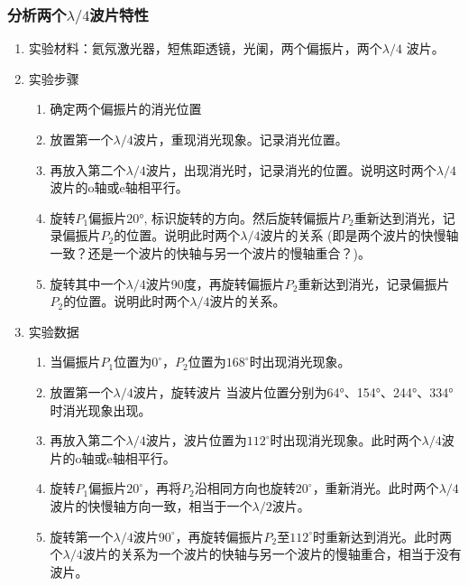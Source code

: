 \documentclass[dvipsnames, svgnames,a4paper,11pt]{article}
\begin{document}
\subsubsection{分析两个$\lambda/4$波片特性}
\begin{enumerate}
	
	\item 实验材料：氦氖激光器，短焦距透镜，光阑，两个偏振片，两个$\lambda/4$ 波片。
	\item 实验步骤
   \begin{enumerate}
		\item  确定两个偏振片的消光位置
		\item 放置第一个$\lambda/4$波片，重现消光现象。记录消光位置。
		\item  再放入第二个$\lambda/4$波片，出现消光时，记录消光的位置。说明这时两个$\lambda/4$波片的o轴或e轴相平行。
		
		\item  旋转$P_1$偏振片20°, 标识旋转的方向。然后旋转偏振片$P_2$重新达到消光，记录偏振片$P_2$的位置。说明此时两个$\lambda/4$波片的关系 (即是两个波片的快慢轴一致？还是一个波片的快轴与另一个波片的慢轴重合？)。
		
		\item  旋转其中一个$\lambda/4$波片90度，再旋转偏振片$P_2$重新达到消光，记录偏振片$P_2$的位置。说明此时两个$\lambda/4$波片的关系。
		
	\end{enumerate}
	\item 实验数据
	\begin{enumerate}
		\item 当偏振片$P_1$位置为$0^\circ$，$P_2$位置为$168^\circ$时出现消光现象。
		\item 放置第一个$\lambda/4$波片，旋转波片 当波片位置分别为64°、154°、244°、334°时消光现象出现。
		\item 再放入第二个$\lambda/4$波片，波片位置为$112^\circ$时出现消光现象。此时两个$\lambda/4$波片的o轴或e轴相平行。
		\item 旋转$P_1$偏振片$20^\circ$，再将$P_2$沿相同方向也旋转$20^\circ$，重新消光。此时两个$\lambda/4$波片的快慢轴方向一致，相当于一个$\lambda/2$波片。
		\item 旋转第一个$\lambda/4$波片$90^\circ$，再旋转偏振片$P_2$至$112^\circ$时重新达到消光。此时两个$\lambda/4$波片的关系为一个波片的快轴与另一个波片的慢轴重合，相当于没有波片。
	\end{enumerate}




\end{enumerate}
\end{document}
